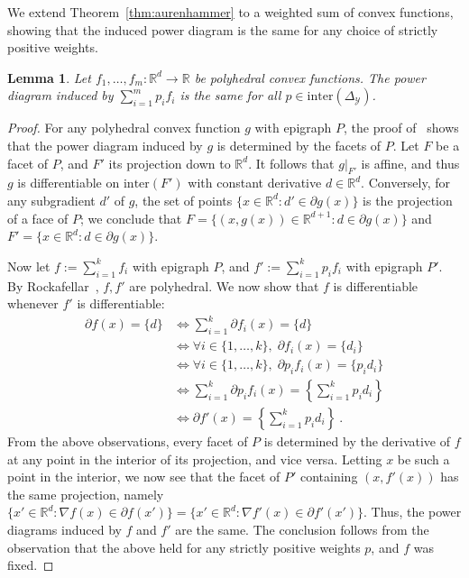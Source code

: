 \documentclass[11pt]{article}
\newcommand{\Comments}{1}
\newcommand{\mynote}[2]{\ifnum\Comments=1\textcolor{#1}{#2}\fi}
\newcommand{\raf}[1]{\mynote{darkgreen}{[RF: #1]}}
\newcommand{\reals}{\mathbb{R}}
\newcommand{\simplex}{\Delta_\Y}
\newcommand{\Y}{\mathcal{Y}}
\newcommand{\inter}{\mathrm{inter}}
\newtheorem{lemma}{Lemma}
\begin{document}
We extend Theorem~\ref{thm:aurenhammer} to a weighted sum of convex functions, showing that the induced power diagram is the same for any choice of strictly positive weights.

\begin{lemma}\label{lem:polyhedral-pd-same}
	Let $f_1,\ldots,f_m:\reals^d\to\reals$ be polyhedral convex functions.
	The power diagram induced by $\sum_{i=1}^m p_i f_i$ is the same for all $p \in \inter(\simplex)$.
\end{lemma}
\begin{proof}
	For any polyhedral convex function $g$ with epigraph $P$, the proof of~\citet[Theorem 4]{aurenhammer1987power} shows that the power diagram induced by $g$ is determined by the facets of $P$.
	Let $F$ be a facet of $P$, and $F'$ its projection down to $\reals^d$.
	It follows that $g|_{F'}$ is affine, and thus $g$ is differentiable on $\inter(F')$ with constant derivative $d\in\reals^d$.
	Conversely, for any subgradient $d'$ of $g$, the set of points $\{x\in\reals^d : d'\in\partial g(x)\}$ is the projection of a face of $P$; we conclude that $F = \{(x,g(x))\in\reals^{d+1} : d\in\partial g(x)\}$ and $F' = \{x\in\reals^d : d\in\partial g(x)\}$.
	
	Now let $f := \sum_{i=1}^k f_i$ with epigraph $P$, and $f' := \sum_{i=1}^k p_i f_i$ with epigraph $P'$.
	By Rockafellar~\cite{rockafellar1997convex}, $f,f'$ are polyhedral.
	We now show that $f$ is differentiable whenever $f'$ is differentiable:
	\begin{align*}
	\partial f(x) = \{d\}
	&\iff \sum_{i=1}^k \partial f_i(x) = \{d\} \\
	&\iff \forall i\in\{1,\ldots,k\}, \; \partial f_i(x) = \{d_i\} \\
	&\iff \forall i\in\{1,\ldots,k\}, \; \partial p_i f_i(x) = \{p_id_i\} \\
	&\iff \sum_{i=1}^k \partial p_if_i(x) = \left\{\sum_{i=1}^k p_id_i\right\} \\
	&\iff \partial f'(x) = \left\{\sum_{i=1}^k p_id_i\right\}~.
	\end{align*}
	From the above observations, every facet of $P$ is determined by the derivative of $f$ at any point in the interior of its projection, and vice versa.
	Letting $x$ be such a point in the interior, we now see that the facet of $P'$ containing $(x,f'(x))$ has the same projection, namely $\{x'\in\reals^d : \nabla f(x) \in \partial f(x')\} = \{x'\in\reals^d : \nabla f'(x) \in \partial f'(x')\}$.
	Thus, the power diagrams induced by $f$ and $f'$ are the same.
	The conclusion follows from the observation that the above held for any strictly positive weights $p$, and $f$ was fixed.
\end{proof}
\end{document}
